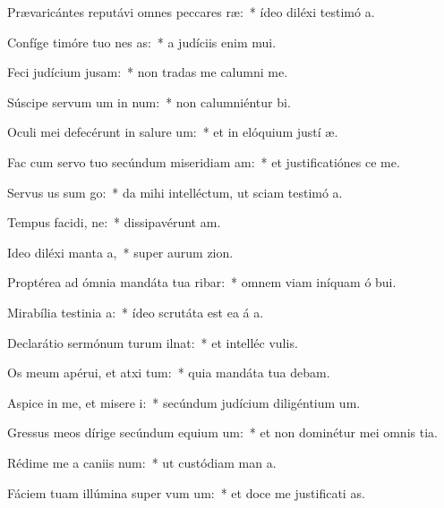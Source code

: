 \item Prævaricántes reputávi omnes peccares ræ:~* ídeo diléxi testimó a.
\item Confíge timóre tuo nes as:~* a judíciis enim  mui.
\item Feci judícium  jusam:~* non tradas me calumni me.
\item Súscipe servum um in num:~* non calumniéntur  bi.
\item Oculi mei defecérunt in salure um:~* et in elóquium justí æ.
\item Fac cum servo tuo secúndum miseridiam am:~* et justificatiónes  ce me.
\item Servus us sum go:~* da mihi intelléctum, ut sciam testimó a.
\item Tempus facidi, ne:~* dissipavérunt  am.
\item Ideo diléxi manta a,~* super aurum  zion.
\item Proptérea ad ómnia mandáta tua ribar:~* omnem viam iníquam ó bui.
\item Mirabília testinia a:~* ídeo scrutáta est ea á a.
\item Declarátio sermónum turum ilnat:~* et intelléc  vulis.
\item Os meum apérui, et atxi tum:~* quia mandáta tua debam.
\item Aspice in me, et misere i:~* secúndum judícium diligéntium  um.
\item Gressus meos dírige secúndum equium um:~* et non dominétur mei omnis tia.
\item Rédime me a caniis num:~* ut custódiam man a.
\item Fáciem tuam illúmina super vum um:~* et doce me justificati as.
